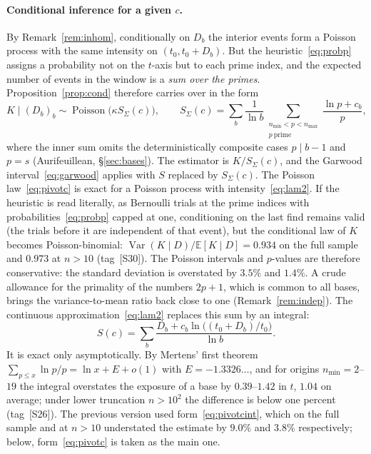 \documentclass[11pt,a4paper]{article}
\theoremstyle{plain}
\theoremstyle{remark}
\DeclareMathOperator{\Pois}{Poisson}
\begin{document}
\paragraph{Conditional inference for a given $c$.} By
Remark~\ref{rem:inhom}, conditionally on $D_b$ the interior events form a
Poisson process with the same intensity on $(t_0,t_0+D_b)$. But the
heuristic~\eqref{eq:probp} assigns a probability not on the $t$-axis but to each
prime index, and the expected number of events in the window is a \emph{sum over
the primes}. Proposition~\ref{prop:cond} therefore carries over in the form
\begin{equation}\label{eq:pivotc}
K\mid(D_b)_b\sim\Pois\bigl(\kappa S_\Sigma(c)\bigr),\qquad
S_\Sigma(c)=\sum_b\frac{1}{\ln b}\sum_{\substack{n_{\min}<p<n_{\max}\\ p\ \text{prime}}}
\frac{\ln p+c_b}{p},
\end{equation}
where the inner sum omits the deterministically composite cases $p\mid b-1$ and
$p=s$ (Aurifeuillean, \S\ref{sec:bases}). The estimator is $K/S_\Sigma(c)$, and
the Garwood interval~\eqref{eq:garwood} applies with $S$ replaced by
$S_\Sigma(c)$. The Poisson law~\eqref{eq:pivotc} is exact for a Poisson process
with intensity~\eqref{eq:lam2}. If the heuristic is read literally, as Bernoulli
trials at the prime indices with probabilities~\eqref{eq:probp} capped at one,
conditioning on the last find remains valid (the trials before it are independent
of that event), but the conditional law of $K$ becomes Poisson-binomial:
$\operatorname{Var}(K\mid D)/\mathbb E[K\mid D]=0.934$ on the full sample and
$0.973$ at $n>10$ (tag~[S30]). The Poisson intervals and $p$-values are therefore
conservative: the standard deviation is overstated by $3.5\%$ and $1.4\%$. A
crude allowance for the primality of the numbers $2p+1$, which is common to all
bases, brings the variance-to-mean ratio back close to one (Remark~\ref{rem:indep}). The continuous approximation~\eqref{eq:lam2} replaces this sum by
an integral:
\begin{equation}\label{eq:pivotcint}
S(c)=\sum_b\frac{D_b+c_b\ln\bigl((t_0+D_b)/t_0\bigr)}{\ln b}.
\end{equation}
It is exact only asymptotically. By Mertens' first theorem
$\sum_{p\le x}\ln p/p=\ln x+E+o(1)$ with $E=-1.3326\ldots$, and for origins
$n_{\min}=2$--$19$ the integral overstates the exposure of a base by
$0.39$--$1.42$ in $t$, $1.04$ on average; under lower truncation $n>10^2$ the
difference is below one percent (tag~[S26]). The previous version used
form~\eqref{eq:pivotcint}, which on the full sample and at $n>10$ understated the
estimate by $9.0\%$ and $3.8\%$ respectively; below, form~\eqref{eq:pivotc} is
taken as the main one.
\end{document}
